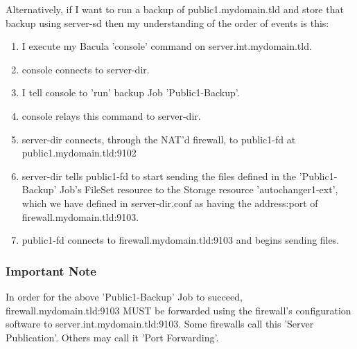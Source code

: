 Alternatively, if I want to run a backup of public1.mydomain.tld and store
that backup using server-sd then my understanding of the order of events is
this: 

\begin{enumerate}
\item I execute my Bacula 'console' command on server.int.mydomain.tld.  
\item console connects to server-dir.  
\item I tell console to 'run' backup Job 'Public1-Backup'.  
\item console relays this command to server-dir.  
\item server-dir connects, through the NAT'd firewall, to public1-fd at 
   public1.mydomain.tld:9102  
\item server-dir tells public1-fd to start sending the files defined in  the
   'Public1-Backup' Job's FileSet resource to the Storage resource 
   'autochanger1-ext', which we have defined in server-dir.conf as having the 
address:port of firewall.mydomain.tld:9103.  
\item public1-fd connects to firewall.mydomain.tld:9103 and begins sending 
   files. 
   \end{enumerate}

\subsubsection*{Important Note}

In order for the above 'Public1-Backup' Job to succeed,
firewall.mydomain.tld:9103 MUST be forwarded using the firewall's
configuration software to server.int.mydomain.tld:9103. Some firewalls call
this 'Server Publication'. Others may call it 'Port Forwarding'. 
